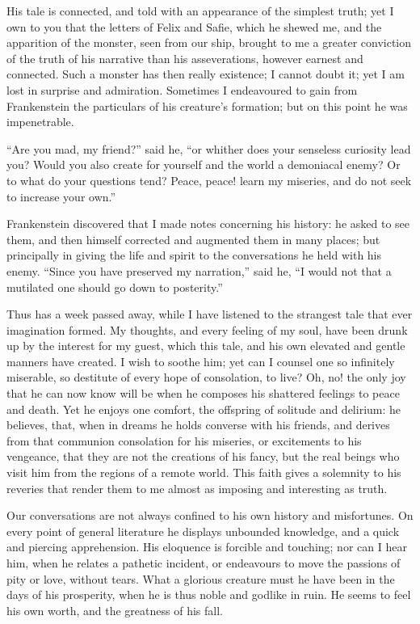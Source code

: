 His tale is connected, and told with
an appearance of the simplest truth;
yet I own to you that the letters of
Felix and Safie, which he shewed me,
and the apparition of the monster,
seen from our ship, brought to me a
greater conviction of the truth of his
narrative than his asseverations, however
earnest and connected. Such a
monster has then really existence; I
cannot doubt it; yet I am lost in surprise
and admiration. Sometimes I
endeavoured to gain from Frankenstein
the particulars of his creature's formation;
but on this point he was impenetrable.

``Are you mad, my friend?'' said he,
``or whither does your senseless curiosity
lead you? Would you also create
for yourself and the world a demoniacal
enemy? Or to what do your questions
tend? Peace, peace! learn my
miseries, and do not seek to increase
your own.''

Frankenstein discovered that I made
notes concerning his history: he asked
to see them, and then himself corrected
and augmented them in many places;
but principally in giving the life and
spirit to the conversations he held with
his enemy. ``Since you have preserved
my narration,'' said he, ``I would
not that a mutilated one should go
down to posterity.''

Thus has a week passed away, while
I have listened to the strangest tale
that ever imagination formed. My
thoughts, and every feeling of my soul,
have been drunk up by the interest for
my guest, which this tale, and his own
elevated and gentle manners have created.
I wish to soothe him; yet can I
counsel one so infinitely miserable, so
destitute of every hope of consolation,
to live? Oh, no! the only joy that
he can now know will be when he
composes his shattered feelings to peace
and death. Yet he enjoys one comfort,
the offspring of solitude and delirium:
he believes, that, when in dreams he
holds converse with his friends, and
derives from that communion consolation
for his miseries, or excitements to
his vengeance, that they are not the
creations of his fancy, but the real
beings who visit him from the regions
of a remote world. This faith gives a
solemnity to his reveries that render
them to me almost as imposing and
interesting as truth.

Our conversations are not always
confined to his own history and misfortunes.
On every point of general
literature he displays unbounded knowledge,
and a quick and piercing apprehension.
His eloquence is forcible and
touching; nor can I hear him, when
he relates a pathetic incident, or endeavours
to move the passions of pity
or love, without tears. What a glorious
creature must he have been in
the days of his prosperity, when he is
thus noble and godlike in ruin. He
seems to feel his own worth, and the
greatness of his fall.

